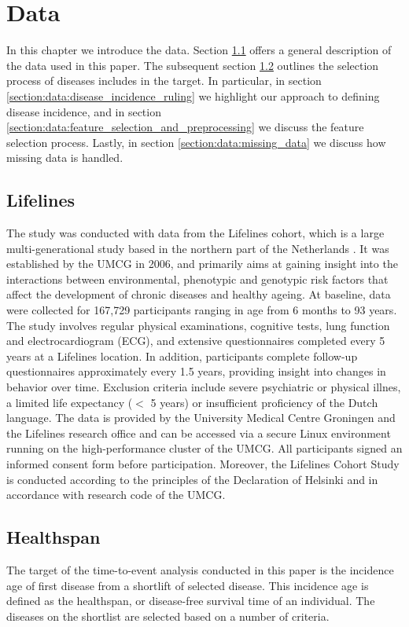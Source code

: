 \chapter{Data }
\label{chap:data}
In this chapter we introduce the data. Section \ref{section:data:data_description} offers a general description of the data used in this paper. The subsequent section \ref{section:data:healthspan_target} outlines the selection process of diseases includes in the target. In particular, in section \ref{section:data:disease_incidence_ruling} we highlight our approach to defining disease incidence, and in section \ref{section:data:feature_selection_and_preprocessing} we discuss the feature selection process. Lastly, in section \ref{section:data:missing_data} we discuss how missing data is handled. 

\section{Lifelines}
\label{section:data:data_description}
The study was conducted with data from the Lifelines cohort, which is a large multi-generational study based in the northern part of the Netherlands \citep{Lifelines}. It was established by the UMCG in 2006, and primarily aims at gaining insight into the interactions between environmental, phenotypic and genotypic risk factors that affect the development of chronic diseases and healthy ageing. At baseline, data were collected for 167,729 participants ranging in age from 6 months to 93 years. The study involves regular physical examinations, cognitive tests, lung function and electrocardiogram (ECG), and extensive questionnaires completed every 5 years at a Lifelines location. In addition, participants complete follow-up questionnaires approximately every 1.5 years, providing insight into changes in behavior over time.
Exclusion criteria include severe psychiatric or physical illnes, a limited life expectancy ($<$ 5 years) or insufficient proficiency of the Dutch language. The data is provided by the University Medical Centre Groningen and the Lifelines research office and can be accessed via a secure Linux environment running on the high-performance cluster of the UMCG. All participants signed an informed consent form before participation. Moreover, the Lifelines Cohort Study is conducted according to the principles of the Declaration of Helsinki and in accordance with research code of the UMCG.

\section{Healthspan}
\label{section:data:healthspan_target} %
The target of the time-to-event analysis conducted in this paper is the incidence age of first disease from a shortlift of selected disease. This incidence age is defined as the healthspan, or disease-free survival time of an individual. The diseases on the shortlist are selected based on a number of criteria. 

